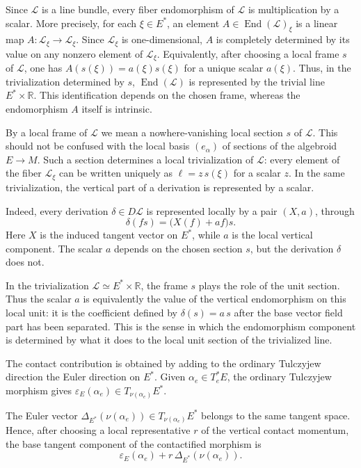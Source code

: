 \documentclass[11pt]{article}
\newcommand{\Lbundle}{\mathcal{L}}
\begin{document}
Since \(\Lbundle\) is a line bundle, every fiber endomorphism of \(\Lbundle\) is multiplication
by a scalar. More precisely, for each \(\xi\in E^*\), an element
\(A\in \operatorname{End}(\Lbundle)_\xi\) is a linear map
\(A:\Lbundle_\xi\to \Lbundle_\xi\). Since \(\Lbundle_\xi\) is one-dimensional, \(A\) is completely
determined by its value on any nonzero element of \(\Lbundle_\xi\). Equivalently, after
choosing a local frame \(s\) of \(\Lbundle\), one has
$A(s(\xi))=a(\xi)s(\xi)$ for a unique scalar \(a(\xi)\). Thus, in the trivialization determined by \(s\),
\(\operatorname{End}(\Lbundle)\) is represented by the trivial line
\(E^*\times\mathbb R\). This identification depends on the chosen frame, whereas
the endomorphism \(A\) itself is intrinsic.

By a local frame of \(\Lbundle\) we mean a nowhere-vanishing local section \(s\) of
\(\Lbundle\). This should not be confused with the local basis \((e_\alpha)\) of
sections of the algebroid \(E\to M\). Such a section determines a local
trivialization of \(\Lbundle\): every element of the fiber \(\Lbundle_\xi\) can be written
uniquely as $\ell=z\,s(\xi)$ for a scalar \(z\). In the same trivialization, the vertical part of a
derivation is represented by a scalar.



Indeed, every derivation \(\delta\in D\Lbundle\) is represented locally by a pair
\((X,a)\), through
\[
\delta(fs)=\bigl(X(f)+af\bigr)s.
\]
Here \(X\) is the induced tangent vector on \(E^*\), while \(a\) is the local
vertical component. The scalar \(a\) depends on the chosen section \(s\), but
the derivation \(\delta\) does not.

In the trivialization \(\Lbundle\simeq E^*\times\mathbb R\), the frame \(s\) plays the
role of the unit section. Thus the scalar \(a\) is equivalently the value of the
vertical endomorphism on this local unit: it is the coefficient defined by $\delta(s)=a\,s$
after the base vector field part has been separated. This is the sense in which the endomorphism component is determined by what it
does to the local unit section of the trivialized line.

The contact contribution is obtained by adding to the ordinary Tulczyjew
direction the Euler direction on \(E^*\). Given \(\alpha_e\in T^*_eE\), the ordinary
Tulczyjew morphism gives
$\varepsilon_E(\alpha_e)\in T_{\nu(\alpha_e)}E^*$.

The Euler vector $\Delta_{E^*}(\nu(\alpha_e))\in T_{\nu(\alpha_e)}E^*$
belongs to the same tangent space. Hence, after choosing a local representative
\(r\) of the vertical contact momentum, the base tangent component of the
contactified morphism is
\[
\varepsilon_E(\alpha_e)+r\,\Delta_{E^*}(\nu(\alpha_e)).
\]
\end{document}
